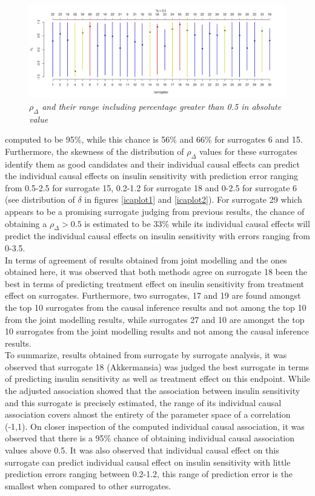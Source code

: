 \documentclass[a4paper,12pt]{article}
\begin{document}
	\begin{figure}[H]
		\centering
		\includegraphics[scale=0.4]{icaplotRange.png}
		\caption{ \emph{$\rho_{\Delta}$ and their range including percentage greater than 0.5 in absolute value}}\label{icarange}
	\end{figure}
	
	computed to be 95\%, while this chance is 56\% and 66\% for surrogates 6 and 15. Furthermore, the skewness of the distribution of $\rho_{\Delta}$ values for these surrogates identify them as good candidates and their individual causal effects can predict the individual causal effects on insulin sensitivity with prediction error ranging from 0.5-2.5 for surrogate 15, 0.2-1.2 for surrogate 18 and 0-2.5 for surrogate 6 (see distribution of $\delta$ in figures \ref{icaplot1} and \ref{icaplot2}). For surrogate 29 which appears to be a promising surrogate judging from previous results, the chance of obtaining a $\rho_{\Delta} > 0.5$ is estimated to be 33\% while its individual causal effects will predict the individual causal effects on insulin sensitivity with errors ranging from 0-3.5. \\
	
	In terms of agreement of results obtained from joint modelling and the ones obtained here, it was observed that both methods agree on surrogate 18 been the best in terms of predicting treatment effect on insulin sensitivity from treatment effect on surrogates. Furthermore, two surrogates, 17 and 19 are found amongst the top 10 surrogates from the causal inference results and not among the top 10 from the joint modelling results, while surrogates 27 and 10 are amongst the top 10 surrogates from the joint modelling results and not among the causal inference results.\\
	
	To summarize, results obtained from surrogate by surrogate analysis, it was observed that surrogate 18 (Akkermansia) was judged the best surrogate in terms of predicting insulin sensitivity as well as treatment effect on this endpoint. While the adjusted association showed that the association between insulin sensitivity and this surrogate is precisely estimated, the range of its individual causal association covers almost the entirety of the parameter space of a correlation (-1,1). On closer inspection of the computed individual causal association, it was observed that there is a 95\% chance of obtaining individual causal association values above 0.5. It was also observed that individual causal effect on this surrogate can predict individual causal effect on insulin sensitivity with little prediction errors ranging between 0.2-1.2, this range of prediction error is the smallest when compared to other surrogates.\\ 
	
\end{document}
